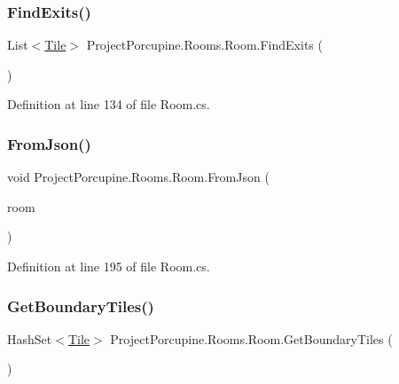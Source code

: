 \subsubsection{\texorpdfstring{Find\+Exits()}{FindExits()}}
{\footnotesize\ttfamily List$<$\hyperlink{class_tile}{Tile}$>$ Project\+Porcupine.\+Rooms.\+Room.\+Find\+Exits (\begin{DoxyParamCaption}{ }\end{DoxyParamCaption})}



Definition at line 134 of file Room.\+cs.

\mbox{\label{class_project_porcupine_1_1_rooms_1_1_room_a6fc719ad032aef8ebac5eeae738d7121}} 
\subsubsection{\texorpdfstring{From\+Json()}{FromJson()}}
{\footnotesize\ttfamily void Project\+Porcupine.\+Rooms.\+Room.\+From\+Json (\begin{DoxyParamCaption}\item[{J\+Token}]{room }\end{DoxyParamCaption})}



Definition at line 195 of file Room.\+cs.

\mbox{\label{class_project_porcupine_1_1_rooms_1_1_room_a0035382b8cd72579028f2f4e9180c9d0}} 
\subsubsection{\texorpdfstring{Get\+Boundary\+Tiles()}{GetBoundaryTiles()}}
{\footnotesize\ttfamily Hash\+Set$<$\hyperlink{class_tile}{Tile}$>$ Project\+Porcupine.\+Rooms.\+Room.\+Get\+Boundary\+Tiles (\begin{DoxyParamCaption}{ }\end{DoxyParamCaption})}




